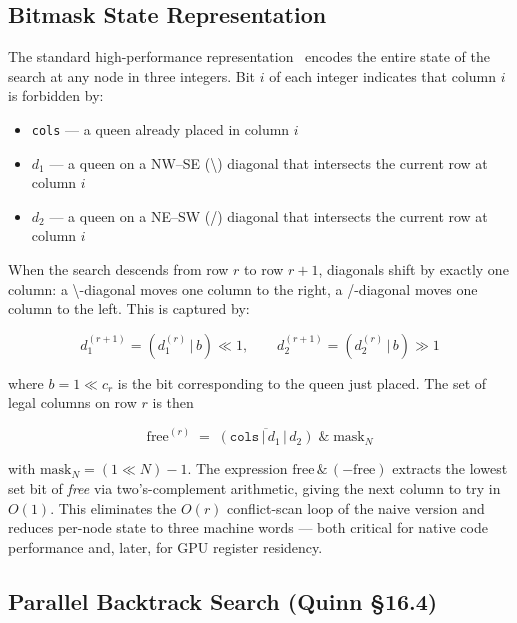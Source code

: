 \documentclass[12pt, letterpaper]{article}
\begin{document}
\subsection{Bitmask State Representation}
\label{ssec:bitmask}

The standard high-performance representation~\cite{somers2002} encodes the entire state of the search at any node in three integers. Bit $i$ of each integer indicates that column $i$ is forbidden by:

\begin{itemize}
    \item \texttt{cols} --- a queen already placed in column $i$
    \item $d_1$ --- a queen on a NW--SE (\textbackslash) diagonal that intersects the current row at column $i$
    \item $d_2$ --- a queen on a NE--SW (/) diagonal that intersects the current row at column $i$
\end{itemize}

When the search descends from row $r$ to row $r+1$, diagonals shift by exactly one column: a \textbackslash-diagonal moves one column to the right, a /-diagonal moves one column to the left. This is captured by:

\begin{equation}
    d_1^{(r+1)} = (d_1^{(r)} \,|\, b) \ll 1, \qquad
    d_2^{(r+1)} = (d_2^{(r)} \,|\, b) \gg 1
\end{equation}

where $b = 1 \ll c_r$ is the bit corresponding to the queen just placed. The set of legal columns on row $r$ is then

\begin{equation}
    \text{free}^{(r)} \;=\; \overline{(\texttt{cols} \,|\, d_1 \,|\, d_2)} \;\&\; \text{mask}_N
    \label{eq:free}
\end{equation}

with $\text{mask}_N = (1 \ll N) - 1$. The expression $\text{free} \,\&\, (-\text{free})$ extracts the lowest set bit of \textit{free} via two's-complement arithmetic, giving the next column to try in $O(1)$. This eliminates the $O(r)$ conflict-scan loop of the naive version and reduces per-node state to three machine words --- both critical for native code performance and, later, for GPU register residency.

\subsection{Parallel Backtrack Search (Quinn \S 16.4)}
\end{document}
